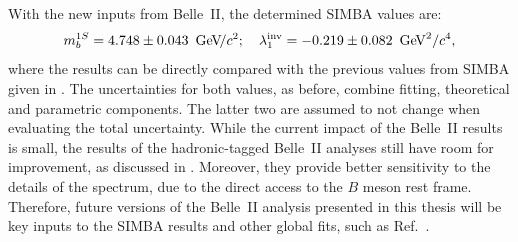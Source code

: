With the new inputs from Belle~II, the determined SIMBA values are:
\begin{equation}\label{eq:new_simba_values}
    m_b^{1S}= 4.748\pm0.043~{\mathrm{\,Ge\kern -0.1em V\!/}c^2}; \quad \lambda_1^{\mathrm{inv}} = -0.219\pm0.082~\mathrm{\,Ge\kern -0.1em V}^2/c^4,
\end{equation}
where the results can be directly compared with the previous values from SIMBA given in .
The uncertainties for both values, as before, combine fitting, theoretical and parametric components.
The latter two are assumed to not change when evaluating the total uncertainty.
While the current impact of the Belle~II results is small, the results of the hadronic-tagged Belle~II analyses still have room for improvement, as discussed in .
Moreover, they provide better sensitivity to the details of the \EB spectrum, due to the direct access to the $B$ meson rest frame.
Therefore, future versions of the Belle~II analysis presented in this thesis will be key inputs to the SIMBA results and other global fits, such as Ref.~\cite{Haller:2018nnx}.